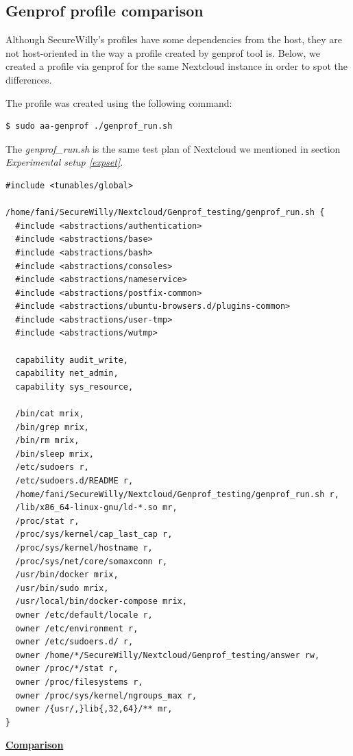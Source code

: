 \subsection{Genprof profile comparison}\label{genprofcompare}
Although SecureWilly's profiles have some dependencies from the host, they are not host-oriented in the way a profile created by genprof tool is. Below, we created a profile via genprof for the same Nextcloud instance in order to spot the differences.

The profile was created using the following command:

\begin{lstlisting}[style=dockercommands]
$ sudo aa-genprof ./genprof_run.sh
\end{lstlisting}

The \textit{genprof\_run.sh} is the same test plan of Nextcloud we mentioned in section \textit{Experimental setup \ref{expset}}.

\begin{lstlisting}[style=Dockerfile, caption={New AppArmor profile for nextcloud service: nextcloud\_profile}]
#include <tunables/global>

/home/fani/SecureWilly/Nextcloud/Genprof_testing/genprof_run.sh {
  #include <abstractions/authentication>
  #include <abstractions/base>
  #include <abstractions/bash>
  #include <abstractions/consoles>
  #include <abstractions/nameservice>
  #include <abstractions/postfix-common>
  #include <abstractions/ubuntu-browsers.d/plugins-common>
  #include <abstractions/user-tmp>
  #include <abstractions/wutmp>

  capability audit_write,
  capability net_admin,
  capability sys_resource,

  /bin/cat mrix,
  /bin/grep mrix,
  /bin/rm mrix,
  /bin/sleep mrix,
  /etc/sudoers r,
  /etc/sudoers.d/README r,
  /home/fani/SecureWilly/Nextcloud/Genprof_testing/genprof_run.sh r,
  /lib/x86_64-linux-gnu/ld-*.so mr,
  /proc/stat r,
  /proc/sys/kernel/cap_last_cap r,
  /proc/sys/kernel/hostname r,
  /proc/sys/net/core/somaxconn r,
  /usr/bin/docker mrix,
  /usr/bin/sudo mrix,
  /usr/local/bin/docker-compose mrix,
  owner /etc/default/locale r,
  owner /etc/environment r,
  owner /etc/sudoers.d/ r,
  owner /home/*/SecureWilly/Nextcloud/Genprof_testing/answer rw,
  owner /proc/*/stat r,
  owner /proc/filesystems r,
  owner /proc/sys/kernel/ngroups_max r,
  owner /{usr/,}lib{,32,64}/** mr,
}
\end{lstlisting}
\hfill\break

\textbf{\underline{Comparison}}
\hfill\break

